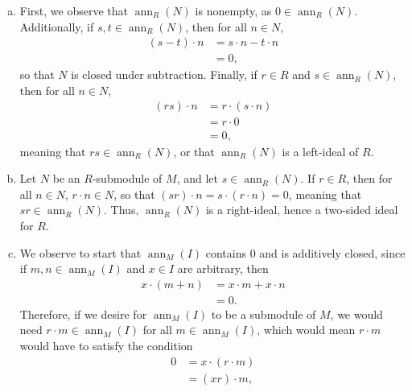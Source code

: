 \documentclass[10pt]{mypackage}
\begin{document}
\begin{solution}\hfill
  \begin{enumerate}[(a)]
    \item First, we observe that $\operatorname{ann}_R(N)$ is nonempty, as $0\in \operatorname{ann}_R(N)$. Additionally, if $s,t\in \operatorname{ann}_R(N)$, then for all $n\in N$,
      \begin{align*}
        \left( s-t \right)\cdot n &= s\cdot n - t\cdot n\\
                                  &= 0,
      \end{align*}
      so that $N$ is closed under subtraction. Finally, if $r\in R$ and $s\in \operatorname{ann}_R\left( N \right)$, then for all $n\in N$,
      \begin{align*}
        \left( rs \right)\cdot n &= r\cdot \left( s\cdot n \right)\\
                                 &= r\cdot 0\\
                                 &= 0,
      \end{align*}
      meaning that $rs\in \operatorname{ann}_R\left( N \right)$, or that $\operatorname{ann}_R\left( N \right)$ is a left-ideal of $R$.
    \item Let $N$ be an $R$-submodule of $M$, and let $s\in \operatorname{ann}_R\left( N \right)$. If $r\in R$, then for all $n\in N$, $r\cdot n\in N$, so that $\left( sr \right)\cdot n = s\cdot \left( r\cdot n \right) = 0$, meaning that $sr\in \operatorname{ann}_R\left( N \right)$. Thus, $\operatorname{ann}_R\left( N \right)$ is a right-ideal, hence a two-sided ideal for $R$.
    \item We observe to start that $\operatorname{ann}_M(I)$ contains $0$ and is additively closed, since if $m,n\in \operatorname{ann}_M\left( I \right)$ and $x\in I$ are arbitrary, then
      \begin{align*}
        x\cdot \left( m + n \right) &= x\cdot m + x\cdot n\\
                                    &= 0.
      \end{align*}
      Therefore, if we desire for $\operatorname{ann}_M(I)$ to be a submodule of $M$, we would need $r\cdot m\in \operatorname{ann}_M(I)$ for all $m\in \operatorname{ann}_M(I)$, which would mean $r\cdot m$ would have to satisfy the condition
      \begin{align*}
        0 &= x\cdot \left( r\cdot m \right)\\
          &= \left( xr \right)\cdot m,
      \end{align*}

\end{enumerate}
\end{solution}
\end{document}
